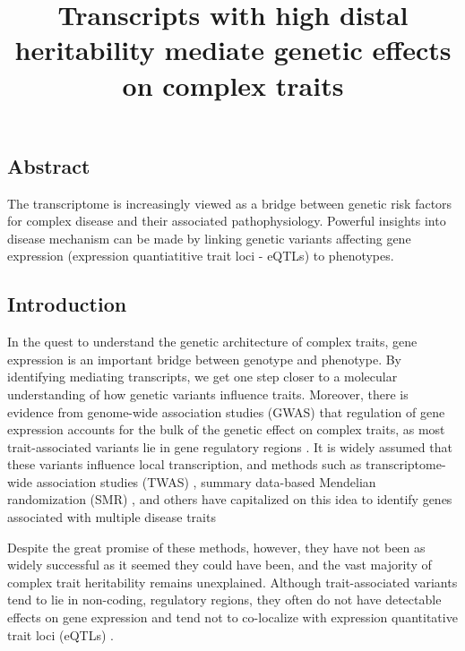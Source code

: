 \documentclass[
]{article}
\title{Transcripts with high distal heritability mediate genetic effects
on complex traits}
\author{}
\date{\vspace{-2.5em}}
\begin{document}
\maketitle

\subsection{Abstract}\label{abstract}

The transcriptome is increasingly viewed as a bridge between genetic
risk factors for complex disease and their associated pathophysiology.
Powerful insights into disease mechanism can be made by linking genetic
variants affecting gene expression (expression quantiatitive trait loci
- eQTLs) to phenotypes.

\subsection{Introduction}\label{introduction}

In the quest to understand the genetic architecture of complex traits,
gene expression is an important bridge between genotype and phenotype.
By identifying mediating transcripts, we get one step closer to a
molecular understanding of how genetic variants influence traits.
Moreover, there is evidence from genome-wide association studies (GWAS)
that regulation of gene expression accounts for the bulk of the genetic
effect on complex traits, as most trait-associated variants lie in gene
regulatory regions \cite{pmid22955828, 
pmid25363779, pmid21617055, pmid19474294, pmid24702953, 
pmid24316577, pmid27126046}. It is widely assumed that these variants
influence local transcription, and methods such as transcriptome-wide
association studies (TWAS)
\cite{pmid33020666, pmid26258848, pmid27019110, pmid26854917}, summary
data-based Mendelian randomization (SMR) \cite{pmid27019110}, and others
have capitalized on this idea to identify genes associated with multiple
disease traits \cite{pmid29567659, pmid35533209, pmid27309819, 
pmid30950127}

Despite the great promise of these methods, however, they have not been
as widely successful as it seemed they could have been, and the vast
majority of complex trait heritability remains unexplained. Although
trait-associated variants tend to lie in non-coding, regulatory regions,
they often do not have detectable effects on gene expression
\cite{pmid32912663} and tend not to co-localize with expression
quantitative trait loci (eQTLs) \cite{pmid36515579, pmid37857933}.
\end{document}
